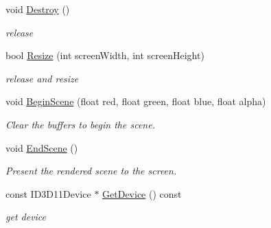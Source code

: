 \begin{DoxyCompactItemize}
void \mbox{\hyperlink{class_direct3_d11_1_1_direct3_d11_renderer_a5d5900d1f76c7bc18b3882d22d5804ef}{Destroy}} ()
\begin{DoxyCompactList}\small\item\em release \end{DoxyCompactList}\item 
\mbox{\label{class_direct3_d11_1_1_direct3_d11_renderer_a0be1f92a8e445dd219a2bc7a0d3eb67d}} 
bool \mbox{\hyperlink{class_direct3_d11_1_1_direct3_d11_renderer_a0be1f92a8e445dd219a2bc7a0d3eb67d}{Resize}} (int screen\+Width, int screen\+Height)
\begin{DoxyCompactList}\small\item\em release and resize \end{DoxyCompactList}\item 
\mbox{\label{class_direct3_d11_1_1_direct3_d11_renderer_aaf454f9e8982061da6ac83e80786f895}} 
void \mbox{\hyperlink{class_direct3_d11_1_1_direct3_d11_renderer_aaf454f9e8982061da6ac83e80786f895}{Begin\+Scene}} (float red, float green, float blue, float alpha)
\begin{DoxyCompactList}\small\item\em Clear the buffers to begin the scene. \end{DoxyCompactList}\item 
\mbox{\label{class_direct3_d11_1_1_direct3_d11_renderer_ac83b9140313eca4e7e02ae0e97a57105}} 
void \mbox{\hyperlink{class_direct3_d11_1_1_direct3_d11_renderer_ac83b9140313eca4e7e02ae0e97a57105}{End\+Scene}} ()
\begin{DoxyCompactList}\small\item\em Present the rendered scene to the screen. \end{DoxyCompactList}\item 
\mbox{\label{class_direct3_d11_1_1_direct3_d11_renderer_aa0a707e33e539f95f77bf1a1d10a7a06}} 
const I\+D3\+D11\+Device $\ast$ \mbox{\hyperlink{class_direct3_d11_1_1_direct3_d11_renderer_aa0a707e33e539f95f77bf1a1d10a7a06}{Get\+Device}} () const
\begin{DoxyCompactList}\small\item\em get device \end{DoxyCompactList}\item 

\end{DoxyCompactItemize}
